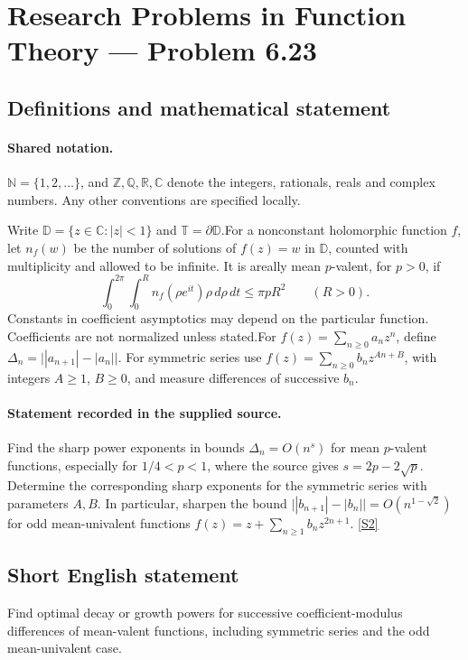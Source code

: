 \documentclass[11pt]{article}
\newcommand{\sref}[2]{\hyperlink{source:#1:#2}{[S#2]}}
\begin{document}
\section{Research Problems in Function Theory — Problem 6.23}\label{statement}

\subsection{Definitions and mathematical statement}

\paragraph{Shared notation.}$\mathbb N=\{1,2,\ldots\}$, and $\mathbb Z,\mathbb Q,\mathbb R,\mathbb C$ denote the integers, rationals, reals and complex numbers. Any other conventions are specified locally.


Write $\mathbb D=\{z\in\mathbb C:|z|<1\}$ and $\mathbb T=\partial\mathbb D$.For a nonconstant holomorphic function $f$, let $n_f(w)$ be the number of solutions of $f(z)=w$ in $\mathbb D$, counted with multiplicity and allowed to be infinite. It is areally mean $p$-valent, for $p>0$, if
\[\int_0^{2\pi}\int_0^R n_f(\rho e^{it})\rho\,d\rho\,dt\le\pi pR^2\qquad(R>0).\]
Constants in coefficient asymptotics may depend on the particular function. Coefficients are not normalized unless stated.For $f(z)=\sum_{n\ge0}a_nz^n$, define $\Delta_n=\big||a_{n+1}|-|a_n|\big|$. For symmetric series use $f(z)=\sum_{n\ge0}b_nz^{An+B}$, with integers $A\ge1$, $B\ge0$, and measure differences of successive $b_n$.
\paragraph{Statement recorded in the supplied source.}
Find the sharp power exponents in bounds $\Delta_n=O(n^s)$ for mean $p$-valent functions, especially for $1/4<p<1$, where the source gives $s=2p-2\sqrt p$. Determine the corresponding sharp exponents for the symmetric series with parameters $A,B$. In particular, sharpen the bound $\big||b_{n+1}|-|b_n|\big|=O(n^{1-\sqrt2})$ for odd mean-univalent functions $f(z)=z+\sum_{n\ge1}b_nz^{2n+1}$. \sref{statement}{2}
\subsection{Short English statement}
Find optimal decay or growth powers for successive coefficient-modulus differences of mean-valent functions, including symmetric series and the odd mean-univalent case.
\end{document}
